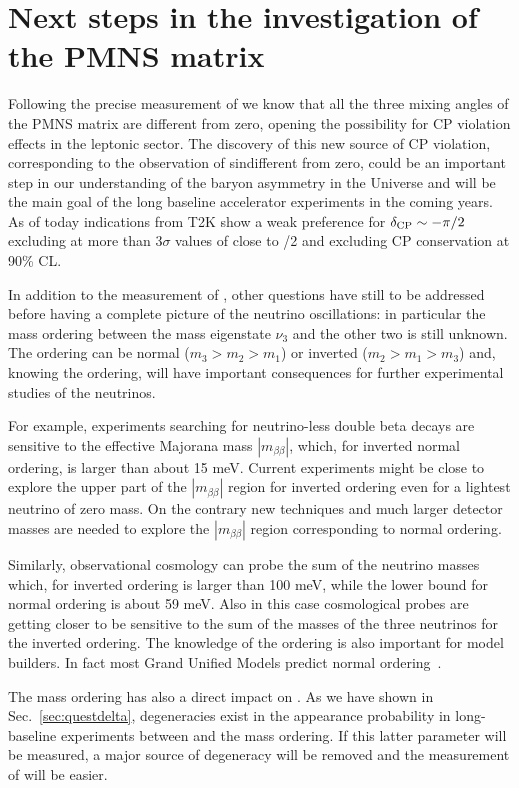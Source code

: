 \section{Next steps in the investigation of the PMNS matrix}
\label{sec:future}

Following the precise measurement of \thint we know that all the three mixing angles of the PMNS matrix are different from zero, opening the possibility for CP violation effects in the leptonic sector. The discovery of this new source of CP violation, corresponding to the observation of  sin\dcp different from zero, could be an important step in our understanding of the baryon asymmetry in the Universe and will be the main goal of the long baseline accelerator experiments in the coming years. As of today indications from T2K show a weak preference for $\delta_{\mathrm{CP}}\sim-\pi/2$ excluding at more than 3$\sigma$ values of \dcp close to \pipi/2 and excluding CP conservation at 90\% CL. 

In addition to the measurement of \dcp, other questions have still to be addressed before having a complete picture of the neutrino oscillations: in particular the mass ordering between the mass eigenstate $\nu_3$ and the other two is still unknown. The ordering can be normal ($m_3 > m_2 > m_1$) or inverted ($m_2 > m_1 > m_3$) and, knowing the ordering, will have important consequences for further experimental studies of the neutrinos. 

For example, experiments searching for neutrino-less double beta decays are sensitive to the effective Majorana mass $|m_{\beta \beta}|$, which, for inverted normal ordering, is larger than about 15 meV. Current experiments might be close to explore the upper part of the $|m_{\beta \beta}|$ region for inverted ordering even for a lightest neutrino of zero mass. 
On the contrary new techniques and much larger detector masses are needed to explore the $|m_{\beta \beta}|$ region corresponding to normal ordering.

Similarly, observational cosmology can probe the sum of the neutrino masses which, for inverted ordering is larger than 100 meV, while the lower bound for normal ordering is about 59 meV. Also in this case cosmological probes are getting closer to be sensitive to the sum of the masses of the three neutrinos for the inverted ordering. 
The knowledge of the ordering is also important for model builders. In fact most Grand Unified Models predict normal ordering~\cite{albright}.

The mass ordering has also a direct impact on \dcp. As we have shown in Sec.~\ref{sec:questdelta}, degeneracies exist in the \nue appearance probability in long-baseline experiments between \dcp and the mass ordering. If this latter parameter will be measured, a major source of degeneracy will be removed and the measurement of \dcp will be easier.

